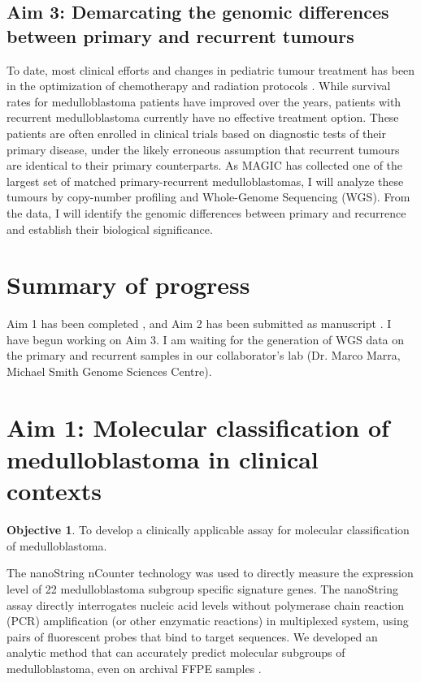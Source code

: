 \documentclass[11pt,letterpaper]{article}
\theoremstyle{definition}
\newtheorem*{objective}{Objective}
\begin{document}
\subsection{Aim 3: Demarcating the genomic differences between primary and recurrent tumours}

To date, most clinical efforts and changes in pediatric tumour treatment has been in the optimization of chemotherapy and radiation protocols . While survival rates for medulloblastoma patients have improved over the years, patients with recurrent medulloblastoma currently have no effective treatment option. These patients are often enrolled in clinical trials based on diagnostic tests of their primary disease, under the likely erroneous assumption that recurrent tumours are identical to their primary counterparts. As MAGIC has collected one of the largest set of matched primary-recurrent medulloblastomas, I will analyze these tumours by copy-number profiling and Whole-Genome Sequencing (WGS). From the data, I will identify the genomic differences between primary and recurrence and establish their biological significance.


\section{Summary of progress}

Aim 1 has been completed , and Aim 2 has been submitted as manuscript .
I have begun working on Aim 3. I am waiting for the generation of WGS data on the primary and recurrent samples in our collaborator's lab (Dr. Marco Marra, Michael Smith Genome Sciences Centre).


\section{Aim 1: Molecular classification of medulloblastoma in clinical contexts}

\begin{objective}
To develop a clinically applicable assay for molecular classification of medulloblastoma.
\end{objective}

The nanoString nCounter technology  was used to directly measure the expression level of 22 medulloblastoma subgroup specific signature genes. The nanoString assay directly interrogates nucleic acid levels without polymerase chain reaction (PCR) amplification (or other enzymatic reactions) in multiplexed system, using pairs of fluorescent probes that bind to target sequences. We developed an analytic method that can accurately predict molecular subgroups of medulloblastoma, even on archival FFPE samples .
\end{document}
